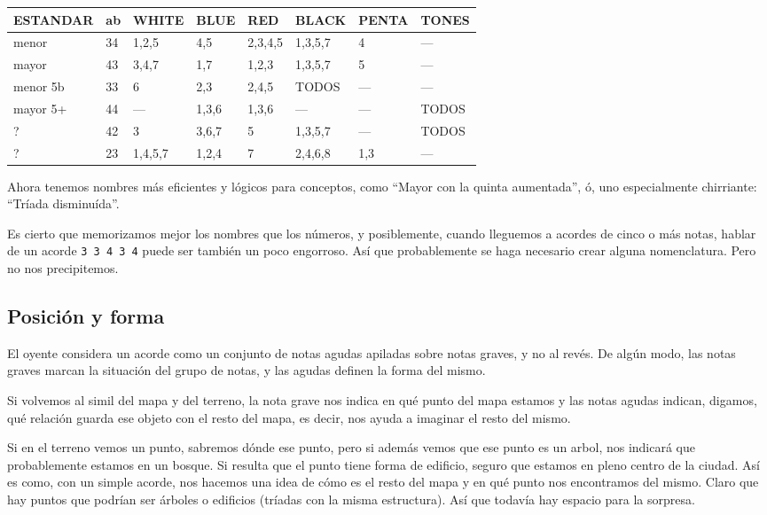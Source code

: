 \documentclass[]{article}
\begin{document}
  \begin{table}[H]
    \centering
    \begin{tabular}{|l|l|l|l|l|l|l|l|}
      \hline
      ESTANDAR & ab & WHITE & BLUE & RED & BLACK & PENTA & TONES \\
      \hline
      menor& 34 & 1,2,5 & 4,5 & 2,3,4,5 & 1,3,5,7 & 4 & --- \\
      \hline
      mayor & 43 & 3,4,7 & 1,7 & 1,2,3 & 1,3,5,7 & 5 & --- \\
      \hline
      menor 5b & 33 & 6 & 2,3 & 2,4,5 & TODOS & --- & --- \\
      \hline
      mayor 5+ & 44 & --- & 1,3,6 & 1,3,6 & --- & --- & TODOS \\
      \hline
      ? & 42 & 3 & 3,6,7 & 5 & 1,3,5,7 & --- & TODOS \\
      \hline
      ? & 23 & 1,4,5,7 & 1,2,4 & 7 & 2,4,6,8 & 1,3 & --- \\
      \hline
    \end{tabular} 
  \end{table}
  
  
  Ahora tenemos nombres más eficientes y lógicos para conceptos, como ``Mayor con la quinta aumentada'', ó, uno especialmente chirriante: ``Tríada disminuída''.
  
  Es cierto que memorizamos mejor los nombres que los números, y posiblemente, cuando lleguemos a acordes de cinco o más notas, hablar de un acorde \texttt{3\ 3\ 4\ 3\ 4} puede ser también un poco engorroso. Así que probablemente se haga necesario crear alguna nomenclatura. Pero no nos precipitemos.
  
  \subsection{Posición y forma}
  
  El oyente considera un acorde como un conjunto de notas agudas apiladas sobre notas graves, y no al revés. De algún modo, las notas graves marcan la situación del grupo de notas, y las agudas definen la forma del mismo.
  
  Si volvemos al simil del mapa y del terreno, la nota grave nos indica en qué punto del mapa estamos y las notas agudas indican, digamos, qué relación guarda ese objeto con el resto del mapa, es decir, nos ayuda a imaginar el resto del mismo.
  
  Si en el terreno vemos un punto, sabremos dónde ese punto, pero si además vemos que ese punto es un arbol, nos indicará que probablemente estamos en un bosque. Si resulta que el punto tiene forma de edificio, seguro que estamos en pleno centro de la ciudad. Así es como, con un simple acorde, nos hacemos una idea de cómo es el resto del mapa y en qué punto nos encontramos del mismo. Claro que hay puntos que podrían ser árboles o edificios (tríadas con la misma estructura). Así que todavía hay espacio para la sorpresa.
  
\end{document}
